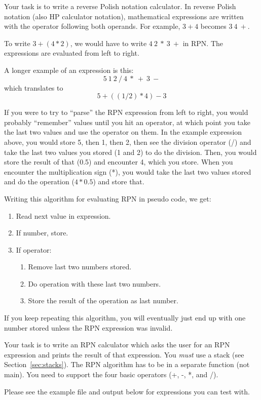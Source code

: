 \documentclass[11pt]{cselabheader}
\begin{document}
\begin{ex} Your task is to write a reverse Polish notation
    calculator. In reverse Polish notation (also HP
    calculator notation), mathematical expressions are written with the operator
    following both operands. For example, $3 + 4$ becomes $3~4~+$.

    To write $3 + (4 * 2)$, we would have to write $4~2~*~3~+$ in RPN. The
    expressions are evaluated from left to right.

    A longer example of an expression is this: 
    \[ 5~1~2~/~4~*~+~3~- \]
    which translates to
    \[ 5 + ( (1 / 2) * 4 ) - 3 \]

    If you were to try to ``parse'' the RPN expression from left to right, you
    would probably ``remember'' values until you hit an operator, at which point
    you take the last two values and use the operator on them. In the example
    expression above, you would store 5, then 1, then 2, then see the division
    operator (/) and take the last two values you stored (1 and 2) to do the
    division. Then, you would store the result of that (0.5) and encounter
    4, which you store. When you encounter the multiplication sign (*), you
    would take the last two values stored and do the operation ($4 * 0.5$)
    and store that. 

    Writing this algorithm for evaluating RPN in pseudo code, we get:

\begin{enumerate}
  \item Read next value in expression.
  \item If number, store.
  \item If operator:
    \begin{enumerate}
      \item Remove last two numbers stored.
      \item Do operation with these last two numbers.
      \item Store the result of the operation as last number.
    \end{enumerate}
\end{enumerate}

    If you keep repeating this algorithm, you will eventually just end up with
    one number stored unless the RPN expression was invalid.

    Your task is to write an RPN calculator which asks the user for an RPN
    expression and prints the result of that expression. You \emph{must} use a
    stack (see Section~\ref{sec:stacks}). The RPN algorithm has to be in a
    separate function (not main). You need to support the four basic operators
    (+, -, *, and /).

    Please see the example file and output below for expressions you can test
    with.

  \end{ex}
\end{document}
